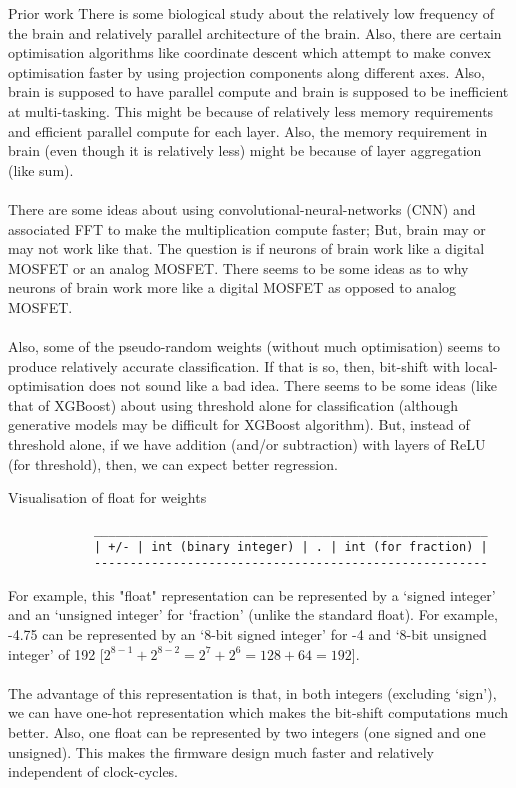 \documentclass{article}
\begin{document}
	\begin{section}{Prior work}
		There is some biological study about the relatively low frequency of the brain and relatively parallel architecture of the brain.\cite{backpropagationBrain} Also, there are certain optimisation algorithms like coordinate descent which attempt to make convex optimisation faster by using projection components along different axes.\cite{coordinateDescent} Also, brain is supposed to have parallel compute and brain is supposed to be inefficient at multi-tasking.\cite{backpropagationBrain} This might be because of relatively less memory requirements and efficient parallel compute for each layer. Also, the memory requirement in brain (even though it is relatively less) might be because of layer aggregation (like sum).\\\\
		There are some ideas about using convolutional-neural-networks (CNN) and associated FFT to make the multiplication compute faster; But, brain may or may not work like that.\cite{FFTsCNN} The question is if neurons of brain work like a digital MOSFET or an analog MOSFET. There seems to be some ideas as to why neurons of brain work more like a digital MOSFET as opposed to analog MOSFET.\cite{backpropagationBrain}\\\\
		Also, some of the pseudo-random weights (without much optimisation) seems to produce relatively accurate classification.\cite{blindDescent} If that is so, then, bit-shift with local-optimisation does not sound like a bad idea. There seems to be some ideas (like that of XGBoost) about using threshold alone for classification (although generative models may be difficult for XGBoost algorithm).\cite{xgboost} But, instead of threshold alone, if we have addition (and/or subtraction) with layers of ReLU (for threshold), then, we can expect better regression.
	\end{section}

	\newpage
	\begin{section}{Visualisation of float for weights}
		\begin{verbatim}
			_______________________________________________________
			| +/- | int (binary integer) | . | int (for fraction) |
			-------------------------------------------------------
		\end{verbatim}
		For example, this "float" representation can be represented by a `signed integer' and an `unsigned integer' for `fraction' (unlike the standard float). For example, -4.75 can be represented by an `8-bit signed integer' for -4 and `8-bit unsigned integer' of 192 [$2^{8 - 1} + 2^{8 - 2} = 2^7 + 2^6 = 128 + 64 = 192$].\\\\
		
		The advantage of this representation is that, in both integers (excluding `sign'), we can have one-hot representation which makes the bit-shift computations much better. Also, one float can be represented by two integers (one signed and one unsigned). This makes the firmware design much faster and relatively independent of clock-cycles.
	\end{section}
\end{document}
